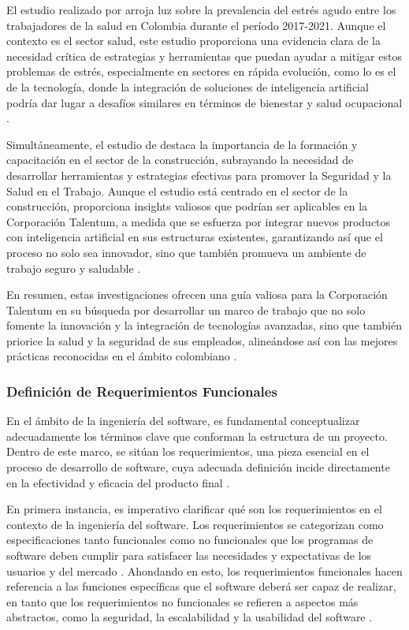 El estudio realizado por \citep{GonzalezDelgado2023AcuteStudy} arroja luz sobre la prevalencia del estrés agudo entre los trabajadores de la salud en Colombia durante el período 2017-2021. Aunque el contexto es el sector salud, este estudio proporciona una evidencia clara de la necesidad crítica de estrategias y herramientas que puedan ayudar a mitigar estos problemas de estrés, especialmente en sectores en rápida evolución, como lo es el de la tecnología, donde la integración de soluciones de inteligencia artificial podría dar lugar a desafíos similares en términos de bienestar y salud ocupacional \citep{GonzalezDelgado2023AcuteStudy}.

Simultáneamente, el estudio de \citep{Yaneth2021StrategiesSector} destaca la importancia de la formación y capacitación en el sector de la construcción, subrayando la necesidad de desarrollar herramientas y estrategias efectivas para promover la Seguridad y la Salud en el Trabajo. Aunque el estudio está centrado en el sector de la construcción, proporciona insights valiosos que podrían ser aplicables en la Corporación Talentum, a medida que se esfuerza por integrar nuevos productos con inteligencia artificial en sus estructuras existentes, garantizando así que el proceso no solo sea innovador, sino que también promueva un ambiente de trabajo seguro y saludable \citep{Yaneth2021StrategiesSector}.

En resumen, estas investigaciones ofrecen una guía valiosa para la Corporación Talentum en su búsqueda por desarrollar un marco de trabajo que no solo fomente la innovación y la integración de tecnologías avanzadas, sino que también priorice la salud y la seguridad de sus empleados, alineándose así con las mejores prácticas reconocidas en el ámbito colombiano \citep{Yaneth2021StrategiesSector,GonzalezDelgado2023AcuteStudy}.


\subsubsection{Definición de Requerimientos Funcionales}
En el ámbito de la ingeniería del software, es fundamental conceptualizar adecuadamente los términos clave que conforman la estructura de un proyecto. Dentro de este marco, se sitúan los requerimientos, una pieza esencial en el proceso de desarrollo de software, cuya adecuada definición incide directamente en la efectividad y eficacia del producto final \citep{Cipriano2023GPT-3Report,Wu2023AgileDesign}.

En primera instancia, es imperativo clarificar qué son los requerimientos en el contexto de la ingeniería del software. Los requerimientos se categorizan como especificaciones tanto funcionales como no funcionales que los programas de software deben cumplir para satisfacer las necesidades y expectativas de los usuarios y del mercado \citep{Cipriano2023GPT-3Report,Wu2023AgileDesign}. Ahondando en esto, los requerimientos funcionales hacen referencia a las funciones específicas que el software deberá ser capaz de realizar, en tanto que los requerimientos no funcionales se refieren a aspectos más abstractos, como la seguridad, la escalabilidad y la usabilidad del software \citep{Cipriano2023GPT-3Report}.

